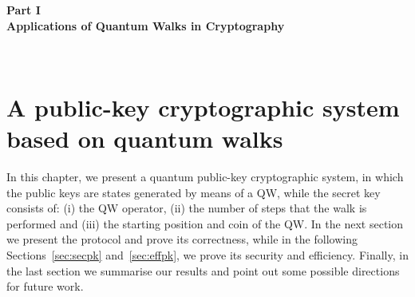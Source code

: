 %


%
\pagestyle{plain}

\begin{center}
\begin{Huge}
\textbf{Part I\\ \vspace{\baselineskip}Applications of Quantum Walks in Cryptography}\end{Huge}
\end{center}\
\newpage
\chapter{A public-key cryptographic system based on quantum walks}



In this chapter, we present a quantum public-key cryptographic system, in which the public keys are states generated by means of a QW, while the secret key consists of: (i) the QW operator, (ii) the number of steps that the walk is performed and (iii) the starting position and coin of the QW.   
In the next section we present the protocol and prove its correctness, while in the following Sections~\ref{sec:secpk} and~\ref{sec:effpk}, we prove its security and efficiency. Finally, in the last section we summarise our results and point out some possible directions for future work.

